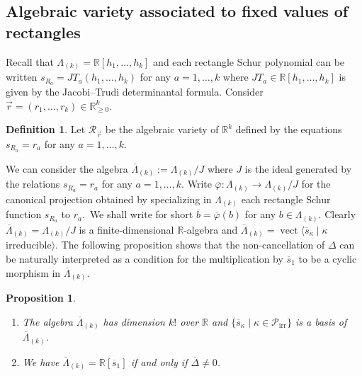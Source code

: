 \documentclass[10pt,a4paper]{amsart}
\newtheorem{prop}[theorem]{Proposition}
\theoremstyle{definition}
\newtheorem{defi}[theorem]{Definition}
\DeclareMathOperator{\irr}{irr}
\DeclareMathOperator{\vect}{vect}
\begin{document}
\subsection{Algebraic variety associated to fixed values of rectangles}

Recall that $\Lambda_{(k)}=\mathbb{R}[h_{1},\ldots,h_{k}]$ and each rectangle
Schur polynomial can be written $s_{R_{a}}=JT_{a}(h_{1},\ldots,h_{k})$ for any
$a=1,\ldots,k$ where $JT_{a}\in\mathbb{R}[h_{1},\ldots,h_{k}]$ is given by the
Jacobi--Trudi determinantal formula. Consider $\vec{r}=(r_{1},\ldots,r_{k}%
)\in\mathbb{R}_{\geq0}^{k}$.

\begin{defi}
\label{Def_Variety}Let $\mathcal{R}_{\vec{r}}$ be the algebraic variety of
$\mathbb{R}^{k}$ defined by the equations $s_{R_{a}}=r_{a}$ for any
$a=1,\ldots,k$.
\end{defi}

We can consider the algebra $\overline{\Lambda}_{(k)}:=\Lambda_{(k)}/J$ where
$J$ is the ideal generated by the relations $s_{R_{a}}=r_{a}$ for any
$a=1,\ldots,k$. Write $\overline{\varphi}:\Lambda_{(k)}\rightarrow
\Lambda_{(k)}/J$ for the canonical projection obtained by specializing in
$\Lambda_{(k)}$ each rectangle Schur function $s_{R_{a}}$ to $r_{a}$.\ We
shall write for short $\overline{b}=\overline{\varphi}(b)$ for any
$b\in\Lambda_{(k)}$. Clearly $\overline{\Lambda}_{(k)}=\Lambda_{(k)}/J$ is a
finite-dimensional $\mathbb{R}$-algebra and $\overline{\Lambda}_{(k)}%
=\vect \langle\overline{s}_{\kappa}\mid\kappa$ irreducible$\rangle$.
The following proposition shows that the non-cancellation of $\Delta$ can be
naturally interpreted as a condition for the multiplication by $\overline
{s}_{1}$ to be a cyclic morphism in $\overline{\Lambda}_{(k)}$.

\begin{prop}
\label{primitive_Specialization} \ 

\begin{enumerate}
\item\label{prop4.11_1} The algebra $\overline{\Lambda}_{(k)}$ has dimension $k!$ over
$\mathbb{R}$ and $\{\overline{s}_{\kappa}\mid\kappa\in\mathcal{P}%
_{\irr }\}$ is a basis of $\overline{\Lambda}_{(k)}$.

\item\label{prop4.11_2} We have $\overline{\Lambda}_{(k)}=\mathbb{R}[\overline{s}_{1}]$ if and
only if $\overline{\Delta}\neq0$.
\end{enumerate}
\end{prop}
\end{document}
